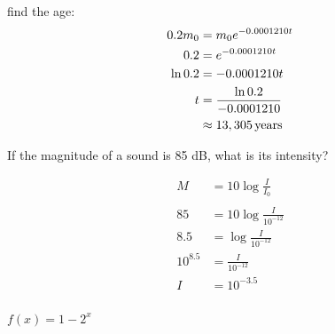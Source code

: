 \documentclass[fleqn,addpoints]{exam}
\begin{document}
\begin{questions}
\begin{solution}
        find the age:
        \begin{align*}
          0.2 m_0 & = m_0 e^{-0.0001210 t} \\
          0.2     & = e^{-0.0001210 t} \\
          \ln 0.2 & = -0.0001210 t \\
          t       & = \frac{\ln 0.2}{-0.0001210} \\
                  & \approx \unit[13,305]{years} \\
        \end{align*}
      \end{solution}

    \question[7]
      If the magnitude of a sound is 85 dB, what is its intensity?  
      

      \begin{solution}
        \begin{align*}
          M        & = 10 \log \frac{I}{I_0} \\
          \\
          85       & = 10 \log \frac{I}{10^{-12}} \\
          8.5      & = \log \frac{I}{10^{-12}} \\
          10^{8.5} & = \frac{I}{10^{-12}} \\
          I        & = 10^{-3.5} \\
        \end{align*}
      \end{solution}

    \question $f(x) = 1 - 2^x$
\end{questions}
\end{document}
